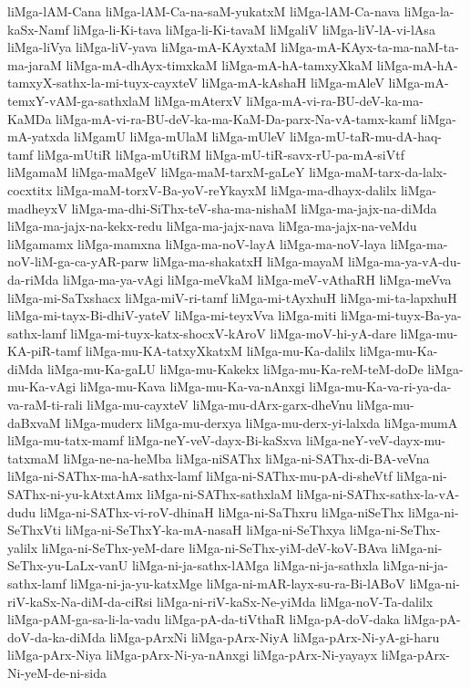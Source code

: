 {liMga-lAM-Cana
liMga-lAM-Ca-na-saM-yukatxM
liMga-lAM-Ca-nava
liMga-la-kaSx-Namf
liMga-li-Ki-tava
liMga-li-Ki-tavaM
liMgaliV
liMga-liV-lA-vi-lAsa
liMga-liVya
liMga-liV-yava
liMga-mA-KAyxtaM
liMga-mA-KAyx-ta-ma-naM-ta-ma-jaraM
liMga-mA-dhAyx-timxkaM
liMga-mA-hA-tamxyXkaM
liMga-mA-hA-tamxyX-sathx-la-mi-tuyx-cayxteV
liMga-mA-kAshaH
liMga-mAleV
liMga-mA-temxY-vAM-ga-sathxlaM
liMga-mAterxV
liMga-mA-vi-ra-BU-deV-ka-ma-KaMDa
liMga-mA-vi-ra-BU-deV-ka-ma-KaM-Da-parx-Na-vA-tamx-kamf
liMga-mA-yatxda
liMgamU
liMga-mUlaM
liMga-mUleV
liMga-mU-taR-mu-dA-haq-tamf
liMga-mUtiR
liMga-mUtiRM
liMga-mU-tiR-savx-rU-pa-mA-siVtf
liMgamaM
liMga-maMgeV
liMga-maM-tarxM-gaLeY
liMga-maM-tarx-da-lalx-cocxtitx
liMga-maM-torxV-Ba-yoV-reYkayxM
liMga-ma-dhayx-dalilx
liMga-madheyxV
liMga-ma-dhi-SiThx-teV-sha-ma-nishaM
liMga-ma-jajx-na-diMda
liMga-ma-jajx-na-kekx-redu
liMga-ma-jajx-nava
liMga-ma-jajx-na-veMdu
liMgamamx
liMga-mamxna
liMga-ma-noV-layA
liMga-ma-noV-laya
liMga-ma-noV-liM-ga-ca-yAR-parw
liMga-ma-shakatxH
liMga-mayaM
liMga-ma-ya-vA-du-da-riMda
liMga-ma-ya-vAgi
liMga-meVkaM
liMga-meV-vAthaRH
liMga-meVva
liMga-mi-SaTxshacx
liMga-miV-ri-tamf
liMga-mi-tAyxhuH
liMga-mi-ta-lapxhuH
liMga-mi-tayx-Bi-dhiV-yateV
liMga-mi-teyxVva
liMga-miti
liMga-mi-tuyx-Ba-ya-sathx-lamf
liMga-mi-tuyx-katx-shocxV-kAroV
liMga-moV-hi-yA-dare
liMga-mu-KA-piR-tamf
liMga-mu-KA-tatxyXkatxM
liMga-mu-Ka-dalilx
liMga-mu-Ka-diMda
liMga-mu-Ka-gaLU
liMga-mu-Kakekx
liMga-mu-Ka-reM-teM-doDe
liMga-mu-Ka-vAgi
liMga-mu-Kava
liMga-mu-Ka-va-nAnxgi
liMga-mu-Ka-va-ri-ya-da-va-raM-ti-rali
liMga-mu-cayxteV
liMga-mu-dArx-garx-dheVnu
liMga-mu-daBxvaM
liMga-muderx
liMga-mu-derxya
liMga-mu-derx-yi-lalxda
liMga-mumA
liMga-mu-tatx-mamf
liMga-neY-veV-dayx-Bi-kaSxva
liMga-neY-veV-dayx-mu-tatxmaM
liMga-ne-na-heMba
liMga-niSAThx
liMga-ni-SAThx-di-BA-veVna
liMga-ni-SAThx-ma-hA-sathx-lamf
liMga-ni-SAThx-mu-pA-di-sheVtf
liMga-ni-SAThx-ni-yu-kAtxtAmx
liMga-ni-SAThx-sathxlaM
liMga-ni-SAThx-sathx-la-vA-dudu
liMga-ni-SAThx-vi-roV-dhinaH
liMga-ni-SaThxru
liMga-niSeThx
liMga-ni-SeThxVti
liMga-ni-SeThxY-ka-mA-nasaH
liMga-ni-SeThxya
liMga-ni-SeThx-yalilx
liMga-ni-SeThx-yeM-dare
liMga-ni-SeThx-yiM-deV-koV-BAva
liMga-ni-SeThx-yu-LaLx-vanU
liMga-ni-ja-sathx-lAMga
liMga-ni-ja-sathxla
liMga-ni-ja-sathx-lamf
liMga-ni-ja-yu-katxMge
liMga-ni-mAR-layx-su-ra-Bi-lABoV
liMga-ni-riV-kaSx-Na-diM-da-ciRsi
liMga-ni-riV-kaSx-Ne-yiMda
liMga-noV-Ta-dalilx
liMga-pAM-ga-sa-li-la-vadu
liMga-pA-da-tiVthaR
liMga-pA-doV-daka
liMga-pA-doV-da-ka-diMda
liMga-pArxNi
liMga-pArx-NiyA
liMga-pArx-Ni-yA-gi-haru
liMga-pArx-Niya
liMga-pArx-Ni-ya-nAnxgi
liMga-pArx-Ni-yayayx
liMga-pArx-Ni-yeM-de-ni-sida
}
